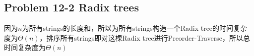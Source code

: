 \subsection*{Problem 12-2 Radix trees}
因为$n$为所有strings的长度和，所以为所有strings构造一个Radix tree的时间复杂度为$\Theta(n)$，排序所有strings即对这棵Radix tree进行Preorder-Traverse，所以总时间复杂度为$\Theta(n)$

